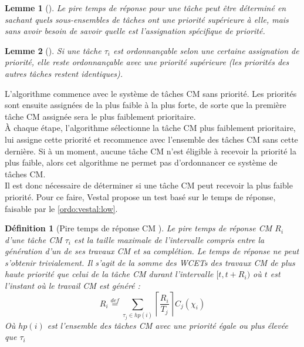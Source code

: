 \documentclass[12pt,a4paper,oneside]{book}
\theoremstyle{break}
\newtheorem{defin}{Définition}[chapter]
\theoremstyle{breakplain}
\newtheorem{lem}{Lemme}[chapter]
\begin{document}
\begin{lem}[\cite{vestal2007preemptive}]
\label{ordo:vestal:low}
Le pire temps de réponse pour une tâche peut être déterminé en sachant quels sous-ensembles de tâches ont une priorité supérieure à elle, mais sans avoir besoin de savoir quelle est l'assignation spécifique de priorité.
\end{lem}

\begin{lem}[\cite{vestal2007preemptive}]
\label{ordo:vestal:higher}
Si une tâche $\tau_i$ est ordonnançable selon une certaine assignation de priorité, elle reste ordonnançable avec une priorité supérieure (les priorités des autres tâches restent identiques).
\end{lem}

L'algorithme commence avec le système de tâches CM sans priorité. Les priorités sont ensuite assignées de la plus faible à la plus forte, de sorte que la première tâche CM assignée sera le plus faiblement prioritaire.\\À chaque étape, l'algorithme sélectionne la tâche CM plus faiblement prioritaire, lui assigne cette priorité et recommence avec l'ensemble des tâches CM sans cette dernière. Si à un moment, aucune tâche CM n'est éligible à recevoir la priorité la plus faible, alors cet algorithme ne permet pas d'ordonnancer ce système de tâches CM.\\

Il est donc nécessaire de déterminer si une tâche CM peut recevoir la plus faible priorité. Pour ce faire, Vestal propose un test basé sur le temps de réponse, faisable par le \autoref{ordo:vestal:low}. \\

\begin{defin}[Pire temps de réponse CM \cite{vestal2007preemptive}]
Le pire temps de réponse CM $R_i$ d'une tâche CM $\tau_i$ est la taille maximale de l'intervalle compris entre la génération d'un de ses travaux CM et sa complétion. Le temps de réponse ne peut s'obtenir trivialement. Il s'agit de la somme des WCETs des travaux CM de plus haute priorité que celui de la tâche CM durant l'intervalle $[t, t+R_i)$ où $t$ est l'instant où le travail CM est généré :
\begin{equation}
R_i \overset{def}{=} \underset{\tau_j \in hp(i)}{\sum} \left\lceil\dfrac{R_i}{T_j}\right\rceil C_j(\chi_i)
\end{equation}
Où $hp(i)$ est l'ensemble des tâches CM avec une priorité égale ou  plus élevée que $\tau_i$
\end{defin}
\end{document}

